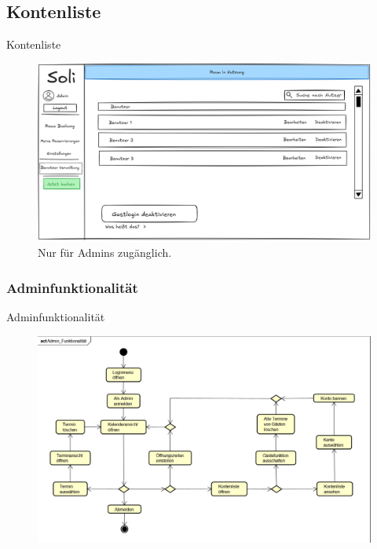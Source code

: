 \documentclass{sdqbeamer}
\begin{document}
\subsection{Kontenliste}
\begin{frame}{Kontenliste}
    \begin{figure}
        \centering
        \includegraphics[width=\textwidth]{pictures/figures/ui/useradminui}
        \caption{Nur für Admins zugänglich.}
        \label{fig:kontenliste}
    \end{figure}
\end{frame}

\subsubsection{Adminfunktionalität}
\begin{frame}{Adminfunktionalität}
    \begin{figure}
        \centering
        \includegraphics[width=\textwidth]{pictures/figures/activity/adminfunk}
        \label{fig:adminfunktionalitaet}
    \end{figure}
\end{frame}
\end{document}
